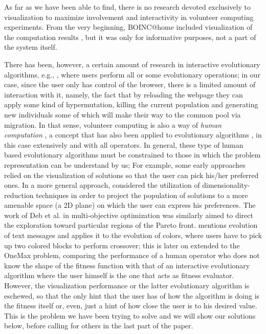 \documentclass{sig-alternate}
\begin{document}
As far as we have been able to find, there is no research devoted
exclusively to visualization to maximize involvement and interactivity
in volunteer computing experiments. From the very beginning,
BOINC@home included visualization of the computation results
\cite{anderson2006designing}, but it was only for informative
purposes, not a part of the system itself. 

There has been, however, a certain amount of research in interactive
evolutionary algorithms, e.g., \cite{takagi01interactive,parmee:human-centric2003,parmee08user-centric,badillo13usercentric}, 
where users perform all or some evolutionary
operations; in our case, since the
user only has control of the browser, there is a limited amount of
interaction with it, namely, the fact that by reloading the webpage they
can apply some kind of hypermutation, killing the current population and
generating new individuals some of which will make their way to the
common pool via migration. In that sense, volunteer computing is also
a way of {\em human computation} \cite{quinn2011human}, a concept that
has also been applied to evolutionary algorithms \cite{972056, Nickerson2013}, in
this case extensively and with all operators. In general, these type
of human based evolutionary algorithms must be constrained to those in
which the problem representation can be understand by us; 
For example, some early approaches 
\cite{Daw86} relied on the visualization of solutions so that the user can 
pick his/her preferred ones. In a more general approach, \cite{takagi-jcis2000} 
considered the utilization of dimensionality-reduction techniques in order
to project the population of solutions to a more amenable space (a 2D plane)
on which the user can express his preferences. The work of Deb et al. in
multi-objective optimization \cite{DC07,DK07} was similarly aimed to direct 
the exploration toward particular regions of the Pareto front.
\cite{cheng2004interactive} mentions evolution of text messages and
applies it to the evolution of colors, where users have to pick up two
colored blocks to perform crossover; this is later on extended to the
OneMax problem, comparing the performance of a human operator who does
not know the shape of the fitness function with that of an interactive
evolutionary algorithm where the user himself is the one that acts as
fitness evaluator.
However, the visualization performance or the latter evolutionary algorithm is
eschewed, so that the only hint
that the user has of how the algorithm is doing is the fitness itself
or, even, just a hint of how close the user is to his desired
value. This is the problem we have been trying to solve and we will
show our solutions below, before calling for others in the last part
of the paper. 
\end{document}
